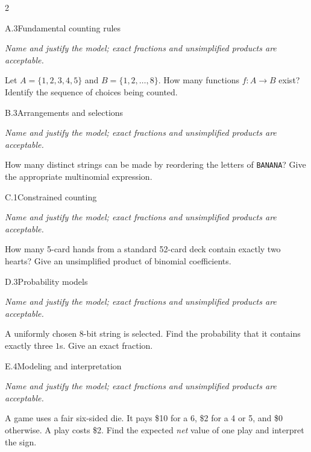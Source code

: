 \documentclass[9pt]{extarticle}
\begin{document}
\begin{multicols}{2}
\begin{CoreProblem}{A.3}{Fundamental counting rules}
{\scriptsize\textit{Name and justify the model; exact fractions and unsimplified products are acceptable.}\par}
Let $A=\{1,2,3,4,5\}$ and $B=\{1,2,\ldots,8\}$. How many functions
    $f:A\to B$ exist? Identify the sequence of choices being counted.
\end{CoreProblem}
\begin{CoreProblem}{B.3}{Arrangements and selections}
{\scriptsize\textit{Name and justify the model; exact fractions and unsimplified products are acceptable.}\par}
How many distinct strings can be made by reordering the letters of
    \texttt{BANANA}? Give the appropriate multinomial expression.
\end{CoreProblem}
\begin{CoreProblem}{C.1}{Constrained counting}
{\scriptsize\textit{Name and justify the model; exact fractions and unsimplified products are acceptable.}\par}
How many 5-card hands from a standard 52-card deck contain exactly
    two hearts? Give an unsimplified product of binomial coefficients.
\end{CoreProblem}
\columnbreak
\begin{CoreProblem}{D.3}{Probability models}
{\scriptsize\textit{Name and justify the model; exact fractions and unsimplified products are acceptable.}\par}
A uniformly chosen 8-bit string is selected. Find the probability
    that it contains exactly three $1$s. Give an exact fraction.
\end{CoreProblem}
\begin{CoreProblem}{E.4}{Modeling and interpretation}
{\scriptsize\textit{Name and justify the model; exact fractions and unsimplified products are acceptable.}\par}
A game uses a fair six-sided die. It pays \$10 for a 6, \$2 for a 4
    or 5, and \$0 otherwise. A play costs \$2. Find the expected \emph{net}
    value of one play and interpret the sign.
\end{CoreProblem}
\end{multicols}
\CoreWorkArea
\FormBreak
{}
\end{document}
